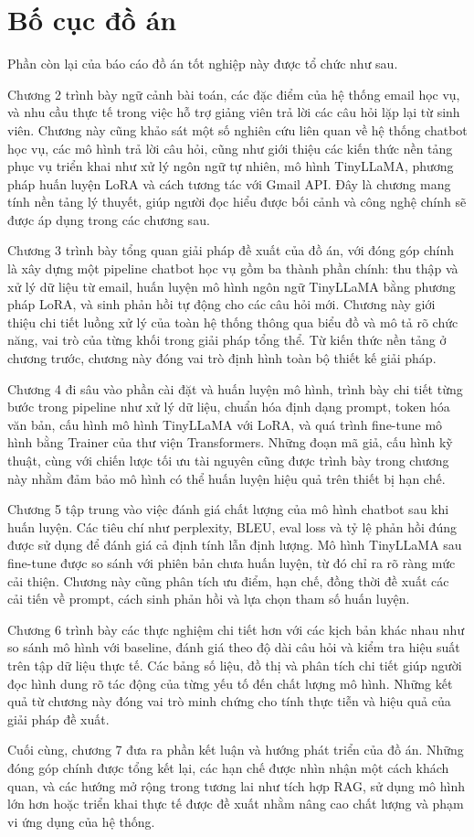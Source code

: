 \documentclass[../DoAn.tex]{subfiles}
\begin{document}
\section{Bố cục đồ án}

Phần còn lại của báo cáo đồ án tốt nghiệp này được tổ chức như sau.

Chương 2 trình bày ngữ cảnh bài toán, các đặc điểm của hệ thống email học vụ, và nhu cầu thực tế trong việc hỗ trợ giảng viên trả lời các câu hỏi lặp lại từ sinh viên. Chương này cũng khảo sát một số nghiên cứu liên quan về hệ thống chatbot học vụ, các mô hình trả lời câu hỏi, cũng như giới thiệu các kiến thức nền tảng phục vụ triển khai như xử lý ngôn ngữ tự nhiên, mô hình TinyLLaMA, phương pháp huấn luyện LoRA và cách tương tác với Gmail API. Đây là chương mang tính nền tảng lý thuyết, giúp người đọc hiểu được bối cảnh và công nghệ chính sẽ được áp dụng trong các chương sau.

Chương 3 trình bày tổng quan giải pháp đề xuất của đồ án, với đóng góp chính là xây dựng một pipeline chatbot học vụ gồm ba thành phần chính: thu thập và xử lý dữ liệu từ email, huấn luyện mô hình ngôn ngữ TinyLLaMA bằng phương pháp LoRA, và sinh phản hồi tự động cho các câu hỏi mới. Chương này giới thiệu chi tiết luồng xử lý của toàn hệ thống thông qua biểu đồ và mô tả rõ chức năng, vai trò của từng khối trong giải pháp tổng thể. Từ kiến thức nền tảng ở chương trước, chương này đóng vai trò định hình toàn bộ thiết kế giải pháp.

Chương 4 đi sâu vào phần cài đặt và huấn luyện mô hình, trình bày chi tiết từng bước trong pipeline như xử lý dữ liệu, chuẩn hóa định dạng prompt, token hóa văn bản, cấu hình mô hình TinyLLaMA với LoRA, và quá trình fine-tune mô hình bằng Trainer của thư viện Transformers. Những đoạn mã giả, cấu hình kỹ thuật, cùng với chiến lược tối ưu tài nguyên cũng được trình bày trong chương này nhằm đảm bảo mô hình có thể huấn luyện hiệu quả trên thiết bị hạn chế.

Chương 5 tập trung vào việc đánh giá chất lượng của mô hình chatbot sau khi huấn luyện. Các tiêu chí như perplexity, BLEU, eval loss và tỷ lệ phản hồi đúng được sử dụng để đánh giá cả định tính lẫn định lượng. Mô hình TinyLLaMA sau fine-tune được so sánh với phiên bản chưa huấn luyện, từ đó chỉ ra rõ ràng mức cải thiện. Chương này cũng phân tích ưu điểm, hạn chế, đồng thời đề xuất các cải tiến về prompt, cách sinh phản hồi và lựa chọn tham số huấn luyện.

Chương 6 trình bày các thực nghiệm chi tiết hơn với các kịch bản khác nhau như so sánh mô hình với baseline, đánh giá theo độ dài câu hỏi và kiểm tra hiệu suất trên tập dữ liệu thực tế. Các bảng số liệu, đồ thị và phân tích chi tiết giúp người đọc hình dung rõ tác động của từng yếu tố đến chất lượng mô hình. Những kết quả từ chương này đóng vai trò minh chứng cho tính thực tiễn và hiệu quả của giải pháp đề xuất.

Cuối cùng, chương 7 đưa ra phần kết luận và hướng phát triển của đồ án. Những đóng góp chính được tổng kết lại, các hạn chế được nhìn nhận một cách khách quan, và các hướng mở rộng trong tương lai như tích hợp RAG, sử dụng mô hình lớn hơn hoặc triển khai thực tế được đề xuất nhằm nâng cao chất lượng và phạm vi ứng dụng của hệ thống.
\end{document}
